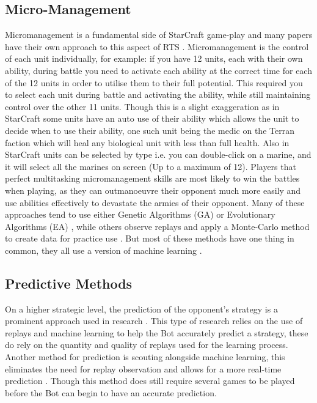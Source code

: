 \documentclass[journal]{IEEEtran}
\begin{document}
	\subsection{Micro-Management}
	Micromanagement is a fundamental side of StarCraft game-play and many papers have their own approach to this aspect of RTS \cite{SOMA,EffectiveMicro,Swarm,MM,SpecialTactics,UnitsControl}. Micromanagement is the control of each unit individually, for example: if you have 12 units, each with their own ability, during battle you need to activate each ability at the correct time for each of the 12 units in order to utilise them to their full potential. This required you to select each unit during battle and activating the ability, while still maintaining control over the other 11 units. Though this is a slight exaggeration as in StarCraft some units have an auto use of their ability which allows the unit to decide when to use their ability, one such unit being the medic on the Terran faction which will heal any biological unit with less than full health. Also in StarCraft units can be selected by type i.e. you can double-click on a marine, and it will select all the marines on screen (Up to a maximum of 12). Players that perfect multitasking micromanagement skills are most likely to win the battles when playing, as they can outmanoeuvre their opponent much more easily and use abilities effectively to devastate the armies of their opponent. Many of these approaches tend to use either Genetic Algorithms (GA) or Evolutionary Algorithms (EA) \cite{SOMA, EffectiveMicro, Swarm}, while others observe replays and apply a Monte-Carlo method to create data for practice use \cite{MM}. But most of these methods have one thing in common, they all use a version of machine learning \cite{Survey}.
	
	\subsection{Predictive Methods}
	On a higher strategic level, the prediction of the opponent's strategy is a prominent approach used in research \cite{DataMine, Bayesian, Scouting, ReplayPred}. This type of research relies on the use of replays and machine learning to help the Bot accurately predict a strategy, these do rely on the quantity and quality of replays used for the learning process\cite{DataMine,Bayesian,ReplayPred}. Another method for prediction is scouting alongside machine learning, this eliminates the need for replay observation and allows for a more real-time prediction \cite{Scouting}. Though this method does still require several games to be played before the Bot can begin to have an accurate prediction.
	
\end{document}
